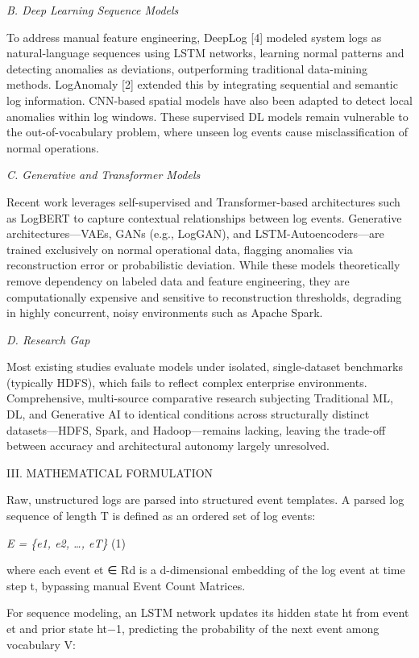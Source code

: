\documentclass[
  11pt,
]{article}
\begin{document}
\emph{B. Deep Learning Sequence Models}

To address manual feature engineering, DeepLog {[}4{]} modeled system
logs as natural-language sequences using LSTM networks, learning normal
patterns and detecting anomalies as deviations, outperforming
traditional data-mining methods. LogAnomaly {[}2{]} extended this by
integrating sequential and semantic log information. CNN-based spatial
models have also been adapted to detect local anomalies within log
windows. These supervised DL models remain vulnerable to the
out-of-vocabulary problem, where unseen log events cause
misclassification of normal operations.

\emph{C. Generative and Transformer Models}

Recent work leverages self-supervised and Transformer-based
architectures such as LogBERT to capture contextual relationships
between log events. Generative architectures---VAEs, GANs (e.g.,
LogGAN), and LSTM-Autoencoders---are trained exclusively on normal
operational data, flagging anomalies via reconstruction error or
probabilistic deviation. While these models theoretically remove
dependency on labeled data and feature engineering, they are
computationally expensive and sensitive to reconstruction thresholds,
degrading in highly concurrent, noisy environments such as Apache Spark.

\emph{D. Research Gap}

Most existing studies evaluate models under isolated, single-dataset
benchmarks (typically HDFS), which fails to reflect complex enterprise
environments. Comprehensive, multi-source comparative research
subjecting Traditional ML, DL, and Generative AI to identical conditions
across structurally distinct datasets---HDFS, Spark, and
Hadoop---remains lacking, leaving the trade-off between accuracy and
architectural autonomy largely unresolved.

\textsc{III. MATHEMATICAL FORMULATION}

Raw, unstructured logs are parsed into structured event templates. A
parsed log sequence of length T is defined as an ordered set of log
events:

\emph{E = \{e1, e2, \ldots, eT\}} (1)

where each event et ∈ Rd is a d-dimensional embedding of the log event
at time step t, bypassing manual Event Count Matrices.

For sequence modeling, an LSTM network updates its hidden state ht from
event et and prior state ht−1, predicting the probability of the next
event among vocabulary V:
\end{document}
